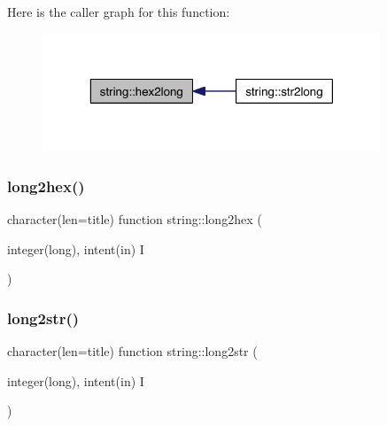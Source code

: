 Here is the caller graph for this function\+:\nopagebreak
\begin{figure}[H]
\begin{center}
\leavevmode
\includegraphics[width=286pt]{namespacestring_a133490e9f060a404b52108895b255435_icgraph}
\end{center}
\end{figure}
\mbox{\label{namespacestring_a58fb75f0ded0856267e7770d4b13b2f6}} 
\subsubsection{\texorpdfstring{long2hex()}{long2hex()}}
{\footnotesize\ttfamily character(len=title) function string\+::long2hex (\begin{DoxyParamCaption}\item[{integer(long), intent(in)}]{I }\end{DoxyParamCaption})\hspace{0.3cm}{\ttfamily [private]}}

\mbox{\label{namespacestring_a734300e2e50f76efa2730b5f1cc7cc21}} 
\subsubsection{\texorpdfstring{long2str()}{long2str()}}
{\footnotesize\ttfamily character(len=title) function string\+::long2str (\begin{DoxyParamCaption}\item[{integer(long), intent(in)}]{I }\end{DoxyParamCaption})\hspace{0.3cm}{\ttfamily [private]}}

\mbox{\label{namespacestring_a43ac41bc9fa839e5e40ec725c029b5a4}} 
